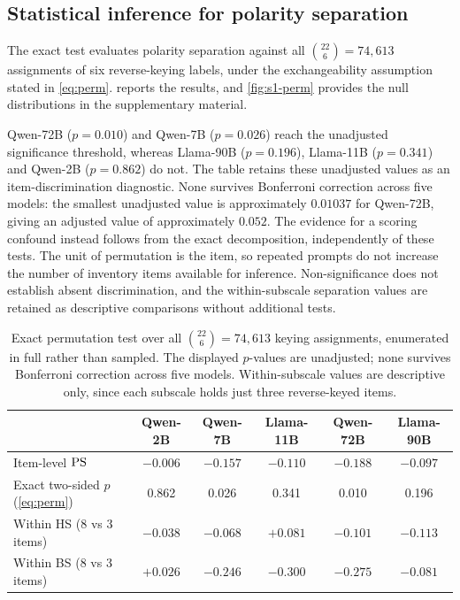 \subsection{Statistical inference for polarity separation}\label{sec:s1-inference}

The exact test evaluates polarity separation against all
$\binom{22}{6}=74{,}613$ assignments of six reverse-keying labels, under
the exchangeability assumption stated in \cref{eq:perm}.
 reports the results, and \cref{fig:s1-perm} provides
the null distributions in the supplementary material.

Qwen-72B ($p=0.010$) and Qwen-7B ($p=0.026$) reach the unadjusted
significance threshold, whereas Llama-90B ($p=0.196$), Llama-11B ($p=0.341$)
and Qwen-2B ($p=0.862$) do not. The table retains these unadjusted values as an item-discrimination
diagnostic. None survives Bonferroni correction across five models: the
smallest unadjusted value is approximately $0.01037$ for Qwen-72B, giving
an adjusted value of approximately $0.052$. The evidence for a scoring
confound instead follows from the exact decomposition, independently of
these tests. The unit of permutation is the item, so repeated prompts do not increase
the number of inventory items available for inference. Non-significance
does not establish absent discrimination, and the within-subscale separation
values are retained as descriptive comparisons without additional tests.

\begin{table}[htbp]\centering\small
\begin{tabularx}{\linewidth}{@{}>{\raggedright\arraybackslash}Xccccc@{}}
\toprule
 & Qwen-2B & Qwen-7B & Llama-11B & Qwen-72B & Llama-90B \\
\midrule
Item-level $\mathrm{PS}$ & $-0.006$ & $-0.157$ & $-0.110$ & $-0.188$ & $-0.097$ \\
Exact two-sided $p$ (\cref{eq:perm}) & 0.862 & 0.026 & 0.341 & 0.010 & 0.196 \\
\midrule
Within HS (8 vs 3 items) & $-0.038$ & $-0.068$ & $+0.081$ & $-0.101$ & $-0.113$ \\
Within BS (8 vs 3 items) & $+0.026$ & $-0.246$ & $-0.300$ & $-0.275$ & $-0.081$ \\
\bottomrule
\end{tabularx}
\caption{Exact permutation test over all $\binom{22}{6}=74{,}613$ keying
assignments, enumerated in full rather than sampled. The displayed $p$-values
are unadjusted; none survives Bonferroni correction across five models.
Within-subscale values are
descriptive only, since each subscale holds just three reverse-keyed items.}
\label{tab:s1-perm}
\end{table}

